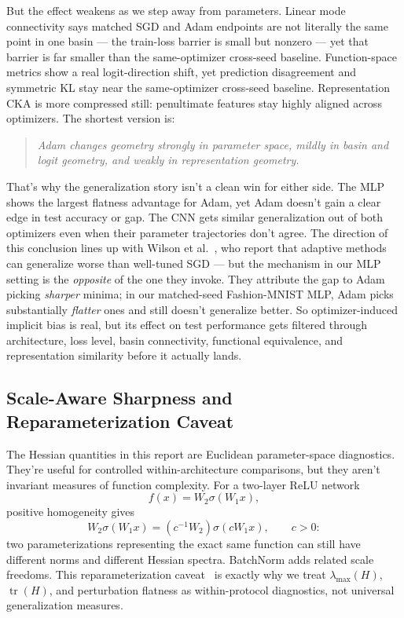 \documentclass[11pt]{article}
\begin{document}
But the effect weakens as we step away from parameters. Linear mode connectivity says matched SGD and Adam endpoints are not literally the same point in one basin --- the train-loss barrier is small but nonzero --- yet that barrier is far smaller than the same-optimizer cross-seed baseline. Function-space metrics show a real logit-direction shift, yet prediction disagreement and symmetric KL stay near the same-optimizer cross-seed baseline. Representation CKA is more compressed still: penultimate features stay highly aligned across optimizers. The shortest version is:
\begin{quote}
\emph{Adam changes geometry strongly in parameter space, mildly in basin and logit geometry, and weakly in representation geometry.}
\end{quote}
That's why the generalization story isn't a clean win for either side. The MLP shows the largest flatness advantage for Adam, yet Adam doesn't gain a clear edge in test accuracy or gap. The CNN gets similar generalization out of both optimizers even when their parameter trajectories don't agree. The direction of this conclusion lines up with Wilson et al.~\cite{wilson2017marginal}, who report that adaptive methods can generalize worse than well-tuned SGD --- but the mechanism in our MLP setting is the \emph{opposite} of the one they invoke. They attribute the gap to Adam picking \emph{sharper} minima; in our matched-seed Fashion-MNIST MLP, Adam picks substantially \emph{flatter} ones and still doesn't generalize better. So optimizer-induced implicit bias is real, but its effect on test performance gets filtered through architecture, loss level, basin connectivity, functional equivalence, and representation similarity before it actually lands.

\subsection{Scale-Aware Sharpness and Reparameterization Caveat}
\label{sec:normalized-sharpness}

The Hessian quantities in this report are Euclidean parameter-space diagnostics. They're useful for controlled within-architecture comparisons, but they aren't invariant measures of function complexity. For a two-layer ReLU network
\[
f(x)=W_2\sigma(W_1x),
\]
positive homogeneity gives
\[
W_2\sigma(W_1x)=(c^{-1}W_2)\sigma(cW_1x),\qquad c>0:
\]
two parameterizations representing the exact same function can still have different norms and different Hessian spectra. BatchNorm adds related scale freedoms. This reparameterization caveat~\cite{dinh2017sharp} is exactly why we treat $\lambda_{\max}(H)$, $\operatorname{tr}(H)$, and perturbation flatness as within-protocol diagnostics, not universal generalization measures.
\end{document}
